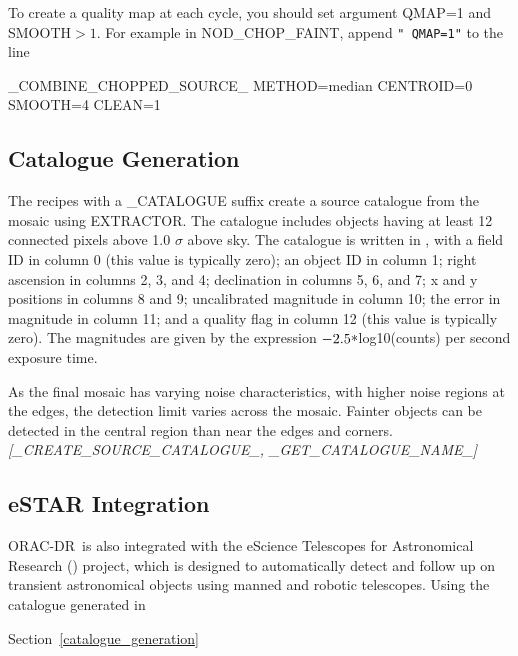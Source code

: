 \documentclass[twoside,11pt,nolof]{starlink}
\providecommand{\lsk}{\raisebox{-0.4ex}{\rm *}}
\providecommand{\EXTRACTOR}{\mbox{\footnotesize EXTRACTOR}}
\providecommand{\ORACDR}{{\footnotesize ORAC-DR}}
\providecommand{\eSTAR}{\htmladdnormallink{eSTAR}{http://www.estar.org.uk/}}
\begin{document}
To create a quality map at each cycle, you should set argument QMAP=1
and SMOOTH$>1$.  For example in NOD\_CHOP\_FAINT, append \texttt{" QMAP=1"}
to the line

\begin{terminalv}
      _COMBINE_CHOPPED_SOURCE_ METHOD=median CENTROID=0 SMOOTH=4 CLEAN=1
\end{terminalv}

\subsection{Catalogue Generation\label{catalogue_generation}}

The recipes with a \_CATALOGUE suffix create a source catalogue from
the mosaic using \EXTRACTOR.  The catalogue includes objects having at
least 12 connected pixels above 1.0 $\sigma$ above sky.  The catalogue
is written in ,
with a field ID in column 0 (this value is typically zero); an object
ID in column 1; right ascension in columns 2, 3, and 4; declination in
columns 5, 6, and 7; x and y positions in columns 8 and 9;
uncalibrated magnitude in column 10; the error in magnitude in column
11; and a quality flag in column 12 (this value is typically zero).
The magnitudes are given by the expression $-2.5 \lsk$log10(counts)
per second exposure time.

As the final mosaic has varying noise characteristics, with higher noise
regions at the edges, the detection limit varies across the mosaic.
Fainter objects can be detected in the central region than near the edges and
corners.
\newline \emph{[\_CREATE\_SOURCE\_CATALOGUE\_, \_GET\_CATALOGUE\_NAME\_]}

\subsection{eSTAR Integration\label{estar_integration}}

\ORACDR\ is also integrated with the eScience Telescopes for Astronomical
Research (\eSTAR) project, which is designed to automatically detect and
follow up on transient astronomical objects using manned and robotic
telescopes. Using the catalogue generated in
\begin{latexonly}
Section~\ref{catalogue_generation}
\end{latexonly}
\end{document}
